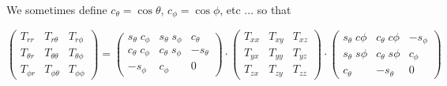 We sometimes define $c_\theta=\cos\theta$, $c_\phi=\cos\phi$, etc ...
so that 

\[
\left(
\begin{array}{ccc}
T_{rr}       & T_{r\theta}      & T_{r\phi} \\
T_{\theta r} & T_{\theta\theta} & T_{\theta\phi} \\
T_{\phi r}   & T_{\phi \theta}  & T_{\phi\phi}
\end{array}
\right)
=
\left(
\begin{array}{ccc}
s_\theta \; c_\phi & s_\theta \; s_\phi & c_\theta \\
c_\theta \; c_\phi & c_\theta \; s_\phi & -s_\theta \\
-s_\phi & c_\phi & 0 
\end{array}
\right)
\cdot
\left(
\begin{array}{ccc}
T_{xx} & T_{xy} & T_{xz} \\
T_{yx} & T_{yy} & T_{yz} \\
T_{zx} & T_{zy} & T_{zz} 
\end{array}
\right)
\cdot
\left(
\begin{array}{ccc}
s_\theta\;c\phi & c_\theta\;c\phi & -s_\phi \\
s_\theta\;s\phi & c_\theta\;s\phi & c_\phi \\
c_\theta & -s_\theta & 0
\end{array}
\right)
\]




